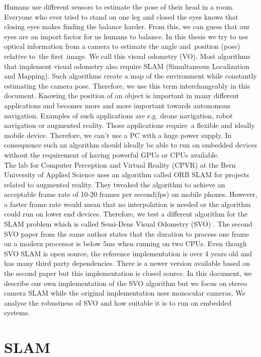 \documentclass[11pt,a4paper,titlepage,oneside]{report}
\begin{document}
Humans use different sensors to estimate the pose of their head in a room. Everyone who ever tried to stand on one leg and closed the eyes knows that closing eyes makes finding the balance harder. From this, we can guess that our eyes are an import factor for us humans to balance. In this thesis we try to use optical information from a camera to estimate the angle and position (pose) relative to the first image. We call this visual odometry (VO). Most algorithms that implement visual odometry also require SLAM (Simultaneous Localization and Mapping). Such algorithms create a map of the environment while constantly estimating the camera pose. Therefore, we use this term interchangeably in this document. Knowing the position of an object is important in many different applications and becomes more and more important towards autonomous navigation. Examples of such applications are e.g. drone navigation, robot navigation or augmented reality. Those applications require a flexible and ideally mobile device. Therefore, we can’t use a PC with a huge power supply. In consequence such an algorithm should ideally be able to run on embedded devices without the requirement of having powerful GPUs or CPUs available.\\
The lab for Computer Perception and Virtual Reality (CPVR) at the Bern University of Applied Science uses an algorithm called ORB SLAM \cite{orbslam} for projects related to augmented reality. They tweaked the algorithm to achieve an acceptable frame rate of 10-20 frames per second(fps) on mobile phones. However, a faster frame rate would mean that no interpolation is needed or the algorithm could run on lower end devices. Therefore, we test a different algorithm for the SLAM problem which is called Semi-Dens Visual Odometry (SVO) \cite{svo}. The second SVO paper \cite{svo2} from the same author states that the duration to process one frame on a modern processor is below 5ms when running on two CPUs. Even though SVO SLAM is open source, the reference implementation is over 4 years old and has many third party dependencies. There is a newer version available based on the second paper but this implementation is closed source. In this document, we describe our own implementation of the SVO algorithm but we focus on stereo camera SLAM while the original implementation uses monocular cameras. We analyse the robustness of SVO and how suitable it is to run on embedded systems.

\section{SLAM}
\end{document}
